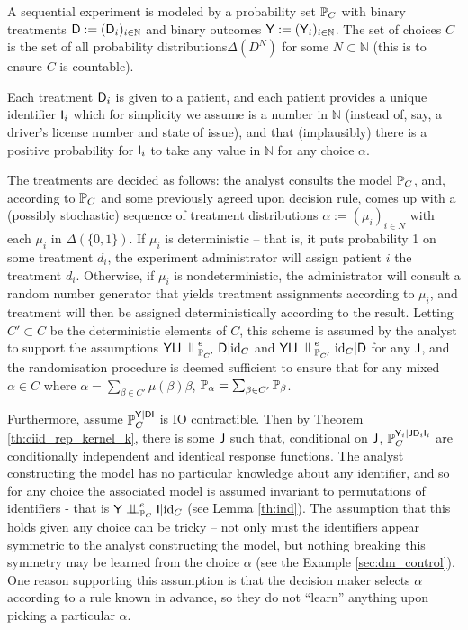 \begin{example}\label{ex:randomised_experiment}
A sequential experiment is modeled by a probability set $\mathbb{P}_C$ with binary treatments $\mathsf{D}:=(\mathsf{D}_i)_{i\in \mathbb{N}}$ and binary outcomes $\mathsf{Y}:=(\mathsf{Y}_i)_{i\in\mathbb{N}}$. The set of choices $C$ is the set of all probability distributions$\Delta(D^N)$ for some $N\subset\mathbb{N}$ (this is to ensure $C$ is countable).

Each treatment $\mathsf{D}_i$ is given to a patient, and each patient provides a unique identifier $\mathsf{I}_i$ which for simplicity we assume is a number in $\mathbb{N}$ (instead of, say, a driver's license number and state of issue), and that (implausibly) there is a positive probability for $\mathsf{I}_i$ to take any value in $\mathbb{N}$ for any choice $\alpha$.

The treatments are decided as follows: the analyst consults the model $\mathbb{P}_C$, and, according to $\mathbb{P}_C$ and some previously agreed upon decision rule, comes up with a (possibly stochastic) sequence  of treatment distributions $\alpha:=(\mu_i)_{i\in N}$ with each $\mu_i$ in $\Delta(\{0,1\})$. If $\mu_i$ is deterministic -- that is, it puts probability 1 on some treatment $d_i$, the experiment administrator will assign patient $i$ the treatment $d_i$. Otherwise, if $\mu_i$ is nondeterministic, the administrator will consult a random number generator that yields treatment assignments according to $\mu_i$, and treatment will then be assigned deterministically according to the result. Letting $C'\subset C$ be the deterministic elements of $C$, this scheme is assumed by the analyst to support the assumptions $\RV{YIJ}\CI^e_{\prob{P}_{C'}} \RV{D}|\text{id}_C$ and $\RV{YIJ}\CI^e_{\prob{P}_{C'}} \text{id}_C|\RV{D}$ for any $\mathsf{J}$, and the randomisation procedure is deemed sufficient to ensure that for any mixed $\alpha\in C$ where $\alpha = \sum_{\beta\in C'} \mu(\beta) \beta$, $\mathbb{P}_\alpha = \sum_{\beta\in C'} \mathbb{P}_\beta$.

Furthermore, assume $\mathbb{P}_C^{\mathsf{Y}|\mathsf{DI}}$ is IO contractible. Then by Theorem \ref{th:ciid_rep_kernel_k}, there is some $\mathsf{J}$ such that, conditional on $\mathsf{J}$, $\mathbb{P}_C^{\mathsf{Y}_i|\mathsf{J}\mathsf{D}_i\mathsf{I}_i}$ are conditionally independent and identical response functions. The analyst constructing the model has no particular knowledge about any identifier, and so for any choice the associated model is assumed invariant to permutations of identifiers - that is $\RV{Y}\CI^e_{\prob{P}_C} \RV{I}|\text{id}_C$ (see Lemma \ref{th:ind}). The assumption that this holds given any choice can be tricky -- not only must the identifiers appear symmetric to the analyst constructing the model, but nothing breaking this symmetry may be learned from the choice $\alpha$ (see the Example \ref{sec:dm_control}). One reason supporting this assumption is that the decision maker selects $\alpha$ according to a rule known in advance, so they do not ``learn'' anything upon picking a particular $\alpha$.


\end{example}
